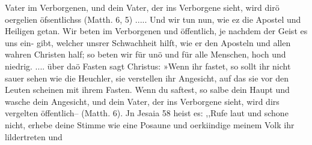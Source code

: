 Vater im Verborgenen, und dein Vater, der ins Verborgene sieht,
wird dirö oergelien öfsentlichss (Matth. 6, 5) ..... Und wir
tun nun, wie ez die Apostel und Heiligen getan. Wir beten im
Verborgenen und öffentlich, je nachdem der Geist es uns ein-
gibt, welcher unsrer Schwachheit hilft, wie er den Aposteln und
allen wahren Christen half; so beten wir für unö und für alle
Menschen, hoch und niedrig. .... über daö Fasten sagt
Christus: »Wenn ihr fastet, so sollt ihr nicht sauer sehen wie die
Heuchler, sie verstellen ihr Angesicht, auf das sie vor den Leuten
scheinen mit ihrem Fasten. Wenn du saftest, so salbe dein Haupt
und wasche dein Angesicht, und dein Vater, der ins Verborgene
sieht, wird dirs vergelten öffentlich-- (Matth. 6). Jn Jesaia 58
heist es: ,,Rufe laut und schone nicht, erhebe deine Stimme wie
eine Posaune und oerkiindige meinem Volk ihr lildertreten und


